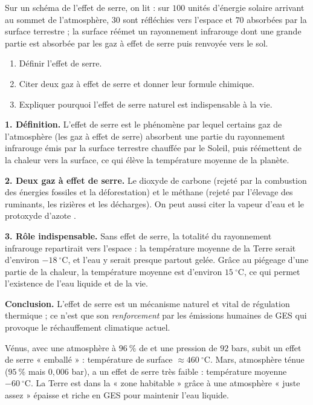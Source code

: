 \documentclass[11pt]{article}
\newcommand{\cle}[1]{{\popxbold\color{popdark}#1}}
\begin{document}
\begin{exoresolu}
Sur un schéma de l'effet de serre, on lit : sur $100$ unités d'énergie solaire arrivant au sommet de l'atmosphère, $30$ sont réfléchies vers l'espace et $70$ absorbées par la surface terrestre ; la surface réémet un rayonnement infrarouge dont une grande partie est absorbée par les gaz à effet de serre puis renvoyée vers le sol.
\begin{enumerate}
\item Définir l'effet de serre.
\item Citer deux gaz à effet de serre et donner leur formule chimique.
\item Expliquer pourquoi l'effet de serre naturel est indispensable à la vie.
\end{enumerate}
\tcblower
\textbf{1. Définition.} L'\cle{effet de serre} est le phénomène par lequel certains gaz de l'atmosphère (les gaz à effet de serre) absorbent une partie du rayonnement infrarouge émis par la surface terrestre chauffée par le Soleil, puis réémettent de la chaleur vers la surface, ce qui élève la température moyenne de la planète.

\textbf{2. Deux gaz à effet de serre.} Le dioxyde de carbone  (rejeté par la combustion des énergies fossiles et la déforestation) et le méthane  (rejeté par l'élevage des ruminants, les rizières et les décharges). On peut aussi citer la vapeur d'eau  et le protoxyde d'azote .

\textbf{3. Rôle indispensable.} Sans effet de serre, la totalité du rayonnement infrarouge repartirait vers l'espace : la température moyenne de la Terre serait d'environ $-18\ ^\circ\mathrm{C}$, et l'eau y serait presque partout gelée. Grâce au piégeage d'une partie de la chaleur, la température moyenne est d'environ $15\ ^\circ\mathrm{C}$, ce qui permet l'existence de l'eau liquide et de la vie.

\textbf{Conclusion.} L'effet de serre est un mécanisme naturel et vital de régulation thermique ; ce n'est que son \emph{renforcement} par les émissions humaines de GES qui provoque le réchauffement climatique actuel.
\end{exoresolu}

\begin{savaistu}
Vénus, avec une atmosphère à $96\ \%$ de  et une pression de $92$ bars, subit un effet de serre « emballé » : température de surface $\approx 460\ ^\circ\mathrm{C}$. Mars, atmosphère ténue ($95\ \%$  mais $0,006$ bar), a un effet de serre très faible : température moyenne $-60\ ^\circ\mathrm{C}$. La Terre est dans la « zone habitable » grâce à une atmosphère « juste assez » épaisse et riche en GES pour maintenir l'eau liquide.
\end{savaistu}
\end{document}
